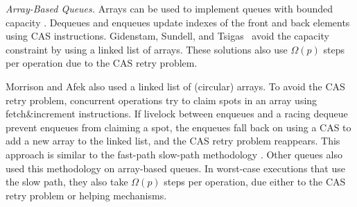 \emph{Array-Based Queues.}
Arrays can be used to implement queues with bounded capacity \cite{DBLP:conf/iceccs/ColvinG05,DBLP:conf/icdcn/Shafiei09,DBLP:conf/spaa/TsigasZ01}.  
Dequeues and enqueues update
indexes of the front and back elements using CAS instructions.
Gidenstam, Sundell, and Tsigas~\cite{DBLP:conf/opodis/GidenstamST10} avoid
the capacity constraint by using a linked list of arrays.
These solutions also use $\Omega(p)$ steps per operation due to the CAS retry problem.

Morrison and Afek \cite{DBLP:conf/ppopp/MorrisonA13} also used a linked list of (circular) arrays.
To avoid the CAS retry problem, concurrent operations try to claim spots in an array using fetch\&increment instructions.
If livelock between enqueues and a racing dequeue prevent enqueues from claiming a spot,
the enqueues fall back on using a CAS to add a new array to the linked list, 
and the CAS retry problem reappears.
This approach is similar to the fast-path slow-path methodology \cite{10.1145/2370036.2145835}.
Other queues \cite{Nik19,10.1145/3490148.3538572,DBLP:conf/ppopp/YangM16} also used this methodology
on array-based queues.
In worst-case executions that use the slow path,
they also take $\Omega(p)$ steps per operation, 
due either to the CAS retry problem or helping mechanisms.




